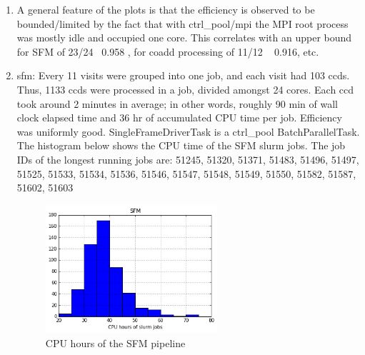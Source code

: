 \documentclass[DM,authoryear,toc]{lsstdoc}
\begin{document}
\begin{enumerate}
\item
A general feature of the plots is that the efficiency is observed to be bounded/limited by the fact that with ctrl{\_}pool/mpi the MPI root process was mostly idle and occupied one core.  This correlates with an upper bound for SFM of 23/24 ~0.958 , for coadd processing of 11/12 ~ 0.916, etc.

\item
sfm: Every 11 visits were grouped into one job, and each visit had 103 ccds. Thus, 1133 ccds were processed in a job, divided amongst 24 cores. Each ccd took around 2 minutes in average; in other words, roughly 90 min of wall clock elapsed time and 36 hr of accumulated CPU time per job. Efficiency was uniformly good. SingleFrameDriverTask is a ctrl{\_}pool BatchParallelTask.  The histogram below shows the CPU time of the SFM slurm jobs. The job IDs of the longest running jobs are: 51245, 51320, 51371, 51483, 51496, 51497, 51525, 51533, 51534, 51536, 51546, 51547, 51548, 51549, 51550, 51582, 51587, 51602, 51603
\begin{figure}[htbp]
        \begin{center}
                 \includegraphics[width=0.6\textwidth]{figures/cpu_sfm}
                 \caption{CPU hours of the SFM pipeline}
                 \label{fig:cpu_sfm}
        \end{center}
\end{figure}


\end{enumerate}
\end{document}
